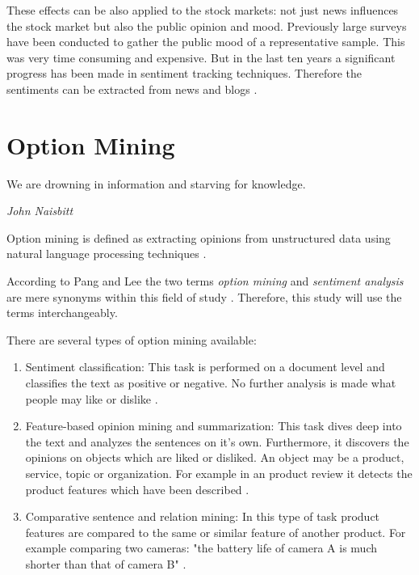 These effects can be also applied to the stock markets: not just news influences the stock market but also the public opinion and mood.
Previously large surveys have been conducted to gather the public mood of a representative sample.
This was very time consuming and expensive.
But in the last ten years a significant progress has been made in sentiment tracking techniques.
Therefore the sentiments can be extracted from news and blogs
\citep{Bollen2011a}.

\section{Option Mining} 
\label{s:background-optionmining}

\epigraph{We are drowning in information and starving for knowledge.}{\textit{John Naisbitt}}

Option mining is defined as extracting opinions from unstructured data using natural language processing techniques \citep[page 411]{Liu2007}.

According to Pang and Lee the two terms \emph{option mining} and \emph{sentiment analysis} are mere synonyms within this field of study \citep{Pang2008c}.
Therefore, this study will use the terms interchangeably.

There are several types of option mining available:

\begin{enumerate}
	\item 
	Sentiment classification: 
	This task is performed on a document level and classifies the text as positive or negative. 
	No further analysis is made what people may like or dislike 
	\citep[page 411]{Liu2007}.
	
	\item 
	Feature-based opinion mining and summarization: 
	This task dives deep into the text and analyzes the sentences on it's own.
	Furthermore, it discovers the opinions on objects which are liked or disliked.
	An object may be a product, service, topic or organization. 
	For example in an product review it detects the product features which have been described 
	\citep[page 412]{Liu2007}.
	
	\item
	Comparative sentence and relation mining:
	In this type of task product features are compared to the same or similar feature of another product.
	For example comparing two cameras: "the battery life of camera A is much shorter than that of camera B" 
	\citep[page 412]{Liu2007}. 
\end{enumerate}

